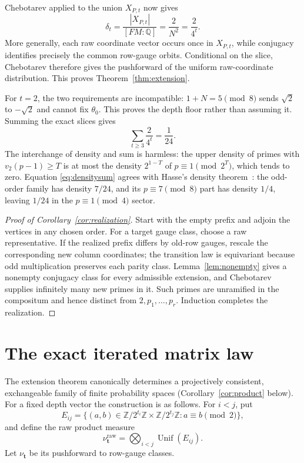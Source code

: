 \documentclass[11pt]{article}
\theoremstyle{definition}
\theoremstyle{remark}
\newcommand{\Z}{\mathbb Z}
\newcommand{\Q}{\mathbb Q}
\newcommand{\vtwo}{v_2}
\begin{document}
Chebotarev applied to the union $X_{P,t}$ now gives~\cite{Neukirch}
\[
 \delta_t=\frac{|X_{P,t}|}{[FM:\Q]}
 =\frac{2}{N^2}=\frac{2}{4^t}.
\]
More generally, each raw coordinate vector occurs once in
$X_{P,t}$, while conjugacy identifies precisely the common row-gauge
orbits.  Conditional on the slice, Chebotarev therefore gives the
pushforward of the uniform raw-coordinate distribution.  This proves
Theorem~\ref{thm:extension}.

For $t=2$, the two requirements are incompatible:
$1+N=5\pmod8$ sends $\sqrt2$ to $-\sqrt2$ and cannot fix $\theta_0$.
This proves the depth floor rather than assuming it.  Summing the exact
slices gives
\begin{equation}\label{eq:densitysum}
 \sum_{t\ge3}\frac{2}{4^t}=\frac1{24}.
\end{equation}
The interchange of density and sum is harmless: the upper density of
primes with $\vtwo(p-1)\ge T$ is at most the density
$2^{1-T}$ of $p\equiv1\pmod{2^T}$, which tends to zero.  Equation
\eqref{eq:densitysum} agrees with Hasse's density theorem~\cite{Hasse}:
the odd-order family has density $7/24$, and its $p\equiv7\pmod8$ part has
density $1/4$, leaving $1/24$ in the $p\equiv1\pmod4$ sector.

\begin{proof}[Proof of Corollary~\ref{cor:realization}]
Start with the empty prefix and adjoin the vertices in any chosen order.
For a target gauge class, choose a raw representative.  If the realized
prefix differs by old-row gauges, rescale the corresponding new column
coordinates; the transition law is equivariant because odd multiplication
preserves each parity class.  Lemma~\ref{lem:nonempty} gives a nonempty
conjugacy class for every admissible extension, and Chebotarev supplies
infinitely many new primes in it.  Such primes are unramified in the
compositum and hence distinct from $2,p_1,\ldots,p_r$.  Induction completes
the realization.
\end{proof}

\section{The exact iterated matrix law}

The extension theorem canonically determines a projectively consistent,
exchangeable family of finite probability spaces
(Corollary~\ref{cor:product} below).  For a fixed depth vector the
construction is as follows.  For $i<j$, put
\[
 E_{ij}=\{(a,b)\in\Z/2^{t_i}\Z\times\Z/2^{t_j}\Z:
                    a\equiv b\pmod2\},
\]
and define the raw product measure
\begin{equation}\label{eq:rawmeasure}
 \nu^{\mathrm{raw}}_{\mathbf t}
   =\bigotimes_{i<j}\operatorname{Unif}(E_{ij}).
\end{equation}
Let $\nu_{\mathbf t}$ be its pushforward to row-gauge classes.
\end{document}
